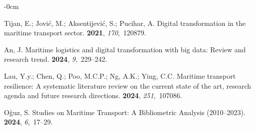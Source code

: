 \documentclass[jmse,review,accept,pdftex,moreauthors]{Definitions/mdpi}
\begin{document}
\begin{adjustwidth}{-\extralength}{0cm}



% 


%
%

\begin{thebibliography}{999}

Tijan, E.; Jovi{\'c}, M.; Aksentijevi{\'c}, S.; Pucihar, A.
\newblock Digital transformation in the maritime transport sector.
 {\bf 2021}, {\em
  170},~120879.

An, J.
\newblock Maritime logistics and digital transformation with big data: Review
  and research trend.
 {\bf 2024}, {\em 9},~229--242.

Lau, Y.y.; Chen, Q.; Poo, M.C.P.; Ng, A.K.; Ying, C.C.
\newblock Maritime transport resilience: A systematic literature review on the
  current state of the art, research agenda and future research directions.
 {\bf 2024}, {\em 251},~107086.

O{\u{g}}uz, S.
\newblock Studies on Maritime Transport: A Bibliometric Analysis (2010--2023).
 {\bf 2024}, {\em 6},~17--29. 


\end{thebibliography}
\end{adjustwidth}
\end{document}
